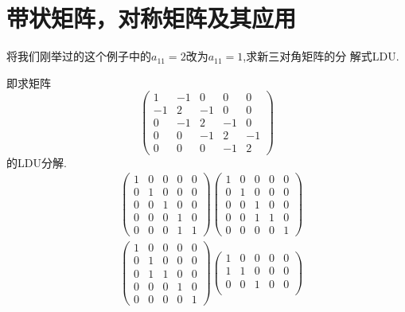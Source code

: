 ﻿\documentclass{book} \usepackage{exsheets} \usepackage{xeCJK}
\begin{document}
\section{带状矩阵，对称矩阵及其应用}
\begin{question}
  将我们刚举过的这个例子中的$a_{11}=2$改为$a_{11}=1$,求新三对角矩阵的分
  解式LDU.
\end{question}
\begin{solution}
  即求矩阵
$$
\begin{pmatrix}
  1&-1&0&0&0\\
  -1&2&-1&0&0\\
  0&-1&2&-1&0\\
  0&0&-1&2&-1\\
  0&0&0&-1&2
\end{pmatrix}
$$
的LDU分解.
\begin{align*}
  &
    \begin{pmatrix}
      1&0&0&0&0\\
      0&1&0&0&0\\
      0&0&1&0&0\\
      0&0&0&1&0\\
      0&0&0&1&1
    \end{pmatrix}
               \begin{pmatrix}
                 1&0&0&0&0\\
                 0&1&0&0&0\\
                 0&0&1&0&0\\
                 0&0&1&1&0\\
                 0&0&0&0&1
               \end{pmatrix}\\&
                                \begin{pmatrix}
                                  1&0&0&0&0\\
                                  0&1&0&0&0\\
                                  0&1&1&0&0\\
                                  0&0&0&1&0\\
                                  0&0&0&0&1
                                \end{pmatrix}
                                           \begin{pmatrix}
                                             1&0&0&0&0\\
                                             1&1&0&0&0\\
                                             0&0&1&0&0\\

\end{pmatrix}
\end{align*}
\end{solution}
\end{document}
